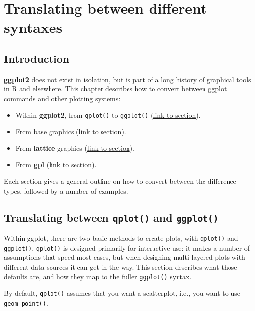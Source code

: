 \chapter{Translating between different syntaxes}\label{cha:translating}

\section{Introduction}

\textbf{ggplot2} does not exist in isolation, but is part of a long
history of graphical tools in R and elsewhere. This chapter describes
how to convert between ggplot commands and other plotting systems:

\begin{itemize}
\itemsep1pt\parskip0pt
\item
  Within \textbf{ggplot2}, from \texttt{qplot()} to \texttt{ggplot()}
  (\hyperref[sec:qplot-ggplot]{link to section}).
\item
  From base graphics (\hyperref[sec:translate-base]{link to section}).
\item
  From \textbf{lattice} graphics (\hyperref[sec:translate-lattice]{link
  to section}).
\item
  From \textbf{gpl} (\hyperref[sec:translate-gpl]{link to section}).
\end{itemize}

Each section gives a general outline on how to convert between the
difference types, followed by a number of examples.

\section{Translating between \texttt{qplot()} and \texttt{ggplot()}}

Within ggplot, there are two basic methods to create plots, with
\texttt{qplot()} and \texttt{ggplot()}. \texttt{qplot()} is designed
primarily for interactive use: it makes a number of assumptions that
speed most cases, but when designing multi-layered plots with different
data sources it can get in the way. This section describes what those
defaults are, and how they map to the fuller \texttt{ggplot()} syntax.
 

By default, \texttt{qplot()} assumes that you want a scatterplot, i.e.,
you want to use \texttt{geom\_point()}.

